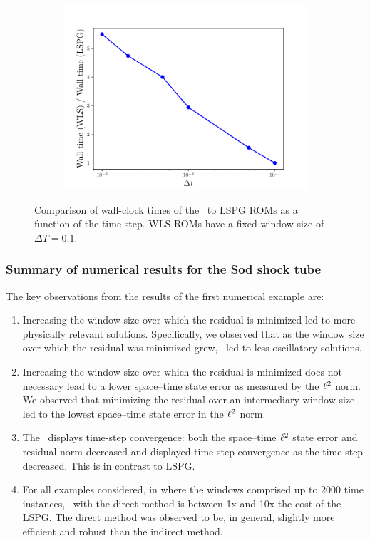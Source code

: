 \begin{figure}
\begin{center}
\begin{subfigure}[t]{0.45\textwidth}
\includegraphics[width=1.\linewidth]{figs/sod/walltime_vs_window_dtvar.pdf}
\label{fig:sod_error_a}
\end{subfigure}
\caption{Comparison of wall-clock times of the \methodAcronymROMs\ to LSPG ROMs as a function of the time step. WLS ROMs have a fixed window size of $\Delta T = 0.1$.} 
\label{fig:walltime_dtvar}
\end{center}
\end{figure}


\subsubsection{Summary of numerical results for the Sod shock tube}
The key observations from the results of the first numerical example are: 
\begin{enumerate}
\item Increasing the window size over which the residual is minimized led to more physically relevant solutions. Specifically, we observed that as the window size over which the residual was minimized grew, \methodAcronym\ led to less oscillatory solutions.
\item Increasing the window size over which the residual is minimized does not necessary lead to a lower space--time state error as measured by the $\ell^2$ norm. We observed that minimizing the residual over an intermediary window size led to the lowest space--time state error in the $\ell^2$ norm. 
\item The \methodAcronym\ displays time-step convergence: both the space--time $\ell^2$ state error and residual norm decreased and displayed time-step convergence as the time step decreased. This is in contrast to LSPG.
\item For all examples considered, in where the windows comprised up to 2000 time instances, \methodAcronym\ with the direct method is between 1x and 10x the cost of the LSPG. The 
direct method was observed to be, in general, slightly more efficient and robust than the indirect method.
\end{enumerate} 


